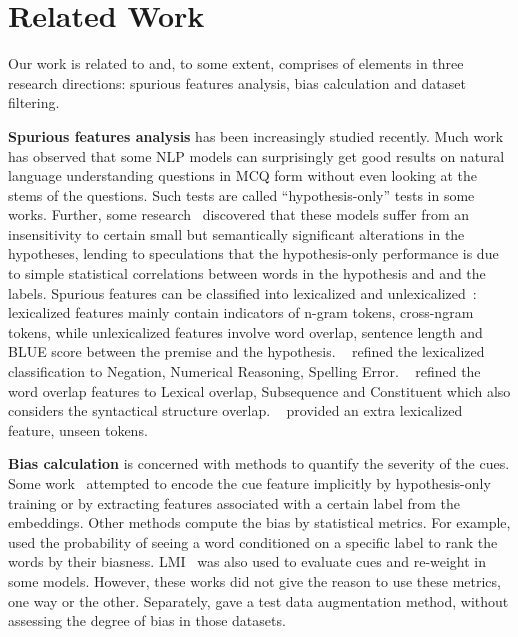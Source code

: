\section{Related Work}
\label{sec:related}

Our work is related to and, to some extent, comprises of 
elements in three research directions: spurious features analysis, 
bias calculation and dataset filtering. 
 
\textbf{Spurious features analysis} has been increasingly studied recently. 
Much work~\cite{sharma2018tackling,srinivasan2018simple,zellers2018swag} 
has observed that some NLP models can surprisingly 
get good results on natural language understanding questions in MCQ form without 
even looking at the stems of the questions. Such tests are called
``hypothesis-only'' tests in some works.
Further, some research~\cite{sanchez2018behavior} discovered that these models 
suffer from an insensitivity to certain small but semantically significant alterations
in the hypotheses, lending to speculations that the hypothesis-only performance
is due to simple statistical correlations between words in the hypothesis and 
and the labels. 
Spurious features can be classified into
lexicalized and unlexicalized~\cite{bowman2015large}:
lexicalized features mainly contain indicators of n-gram tokens, cross-ngram tokens, 
while unlexicalized features involve word overlap, sentence length and BLUE score between 
the premise and the hypothesis. ~\cite{naik2018stress} refined the 
lexicalized classification to Negation, Numerical Reasoning, 
Spelling Error. ~\cite{mccoy2019right} refined the word overlap 
features to Lexical overlap, Subsequence and Constituent 
which also considers the syntactical structure overlap. ~\cite{sanchez2018behavior} 
provided an extra lexicalized feature, unseen tokens. 

\textbf{Bias calculation} is concerned with methods to quantify the severity of the cues. 
Some work~\cite{clark2019don,he2019unlearn,yaghoobzadeh2019robust} 
attempted to encode the cue feature implicitly by 
hypothesis-only training or by extracting features associated with a certain label 
from the embeddings. 
Other methods compute the bias by statistical metrics. 
For example, \cite{yu2020reclor} used the probability of seeing a word 
conditioned on a specific label to rank the words by their biasness. 
LMI~\cite{schuster2019towards} was also used to evaluate cues and 
re-weight in some models. 
However, these works did not give the reason to use these metrics, one way or 
the other.
Separately, \cite{Marco2020acl} gave a test data augmentation method, 
without assessing the degree of bias in those datasets.

